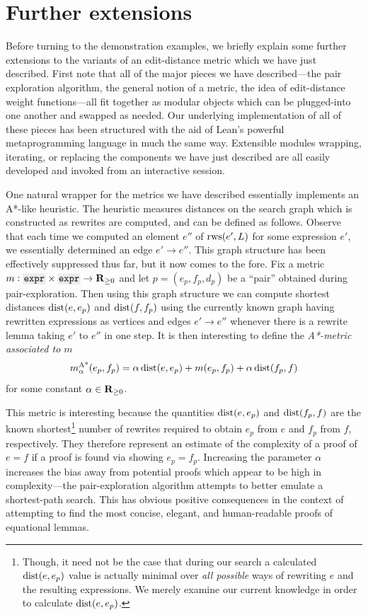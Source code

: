 \documentclass[12pt]{article}
\begin{document}
\section{Further extensions}

Before turning to the demonstration examples, we briefly explain some further extensions to the variants of an edit-distance metric which we have just described. First note that all of the major pieces we have described---the pair exploration algorithm, the general notion of a metric, the idea of edit-distance weight functions---all fit together as modular objects which can be plugged-into one another and swapped as needed. Our underlying implementation of all of these pieces has been structured with the aid of Lean's powerful metaprogramming language in much the same way. Extensible modules wrapping, iterating, or replacing the components we have just described are all easily developed and invoked from an interactive session.

One natural wrapper for the metrics we have described essentially implements an A*-like heuristic. The heuristic measures distances on the search graph which is constructed as rewrites are computed, and can be defined as follows. Observe that each time we computed an element $e''$ of $\operatorname{rws}(e', L)$ for some expression $e'$, we essentially determined an edge $e' \to e''$. This graph structure has been effectively suppressed thus far, but it now comes to the fore. Fix a metric $m : \expr{} \times \expr{} \to \RR_{\geq 0}$ and let $p = (e_p, f_p, d_p)$ be a ``pair'' obtained during pair-exploration. Then using this graph structure we can compute shortest distances $\operatorname{dist}(e, e_p)$ and $\operatorname{dist}(f, f_p)$ using the currently known graph having rewritten expressions as vertices and edges $e' \to e''$ whenever there is a rewrite lemma taking $e' $ to $e''$ in one step. It is then interesting to define the \textit{A*-metric associated to $m$}
\begin{equation*}
  m^\text{A*}_{\alpha}(e_p, f_p) = \alpha \operatorname{dist}(e, e_p) + m(e_p, f_p) + \alpha \operatorname{dist}(f_p, f)
\end{equation*}
for some constant $\alpha \in \mathbf{R}_{\geq 0}$.

This metric is interesting because the quantities $\operatorname{dist}(e, e_p)$ and $\operatorname{dist}(f_p, f)$ are the known shortest\footnote{Though, it need not be the case that during our search a calculated $\operatorname{dist}(e, e_p)$ value is actually minimal over \textit{all possible} ways of rewriting $e$ and the resulting expressions. We merely examine our current knowledge in order to calculate $\operatorname{dist}(e, e_p)$.} number of rewrites required to obtain $e_p$ from $e$ and $f_p$ from $f$, respectively. They therefore represent an estimate of the complexity of a proof of $e = f$ if a proof is found via showing $e_p = f_p$. Increasing the parameter $\alpha$ increases the bias away from potential proofs which appear to be high in complexity---the pair-exploration algorithm attempts to better emulate a shortest-path search. This has obvious positive consequences in the context of attempting to find the most concise, elegant, and human-readable proofs of equational lemmas.
\end{document}
